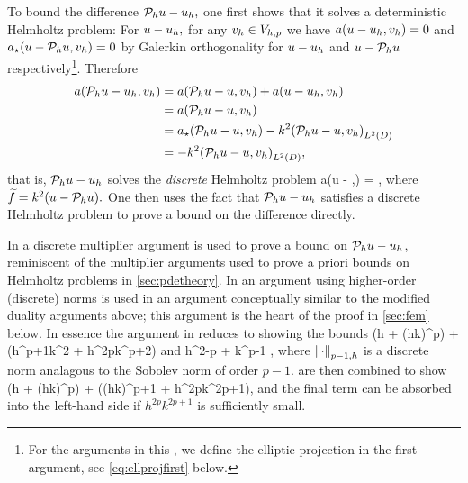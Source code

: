 To bound the difference $\mathcal P_{h} u - u_{h},$ one first shows that it solves a deterministic Helmholtz problem:
For $u-u_{h},$ for any $v_{h} \in V_{h,p}$ we have $a(u-u_{h},v_{h}) = 0$ and $a_{\star}(u-\mathcal P_{h} u,v_{h}) = 0$ by Galerkin orthogonality for $u-u_{h}$ and $u-\mathcal P_{h} u$ respectively\footnote{For the arguments in this , we define the elliptic projection in the first argument, see \cref{eq:ellprojfirst} below.}. Therefore
\begin{align*}
  a(\Ph u - \uh,\vh) &= a(\Ph u - u,\vh) + a(u-\uh,\vh)\\
  &= a(\Ph u - u,\vh)\\
  &= \aep(\Ph u - u,\vh) - k^2\IPLtD{\Ph u - u}{\vh}\\
  &= - k^2\IPLtD{\Ph u - u}{\vh},
\end{align*}
that is, $\mathcal P_{h} u - u_{h}$ solves the \emph{discrete} Helmholtz problem
\beqs
a(\Ph u - \uh,\vh) = \IPLtD{\ftilde}{\vh} \tforall \vh \in \Vhp,
\eeqs
where $\ftilde = k^2\mleft(u-\Ph u\mright).$ One then uses the fact that $\mathcal P_{h} u - u_{h}$ satisfies a discrete Helmholtz problem to prove a bound on the difference directly.

In \cite{FeWu:09,FeWu:11,Wu:14} a discrete multiplier argument is used to prove a bound on $\mathcal P_{h} u - u_{h}$, reminiscent of the multiplier arguments used to prove a priori bounds on Helmholtz problems in \cref{sec:pdetheory}. In \cite{DuWu:15} an argument using higher-order (discrete) norms is used in an argument conceptually similar to the modified duality arguments above; this argument is the heart of the proof in \cref{sec:fem} below. In essence the argument in \cite{DuWu:15} reduces to showing the bounds
\beq\label{eq:duwu1}
 \lesssim \mleft(h + \mleft(hk\mright)^p\mright) + \mleft(h^{p+1}k^2 + h^{2p}k^{p+2}\mright)
\eeq
and
\beq\label{eq:duwu2}
 \lesssim h^{2-p}  + k^{p-1} ,
\eeq
where $\Nfn{p-1,h}{\cdot}$ is a discrete norm analagous to the Sobolev norm of order $p-1$.  are then combined to show
\beqs
{} \lesssim \mleft(h + \mleft(hk\mright)^p\mright) + \mleft(\mleft(hk\mright)^{p+1} + h^{2p}k^{2p+1}\mright),
\eeqs
and the final term can be absorbed into the left-hand side if $h^{2p}k^{2p+1}$ is sufficiently small.



